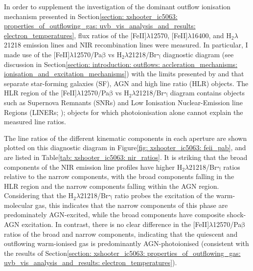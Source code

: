 In order to supplement the investigation of the dominant outflow ionisation mechanism presented in Section\;\ref{section: xshooter_ic5063: properties_of_outflowing_gas: uvb_vis_analysis_and_results: electron_temperatures}, flux ratios of the [FeII]$\lambda$12570, [FeII]$\lambda$16400, and H$_2 \lambda$21218 emission lines and NIR recombination lines \citep{Rodriguez-Ardila2005, Riffel2013a, Colina2015, Riffel2021} were measured. In particular, I made use of the [FeII]$\lambda$12570/Pa$\mathrm{\beta}$ vs H$_2\lambda$21218/Br$\mathrm{\gamma}$ diagnostic diagram (see discussion in Section\;\ref{section: introduction: outflows: accleration_mechanisms: ionisation_and_excitation_mechanisms}) with the limits presented by \citet{Riffel2013a} and \citet{Riffel2021} that separate star-forming galaxies (SF), AGN and high line ratio (HLR) objects. The HLR region of the [FeII]$\lambda$12570/Pa$\mathrm{\beta}$ vs H$_2\lambda$21218/Br$\mathrm{\gamma}$ diagram contains objects such as Supernova Remnants (SNRs) and Low Ionisation Nuclear-Emission line Regions (LINERs; \citealt{Heckman1980}); objects for which photoionisation alone cannot explain the measured line ratios.

The line ratios of the different kinematic components in each aperture are shown plotted on this diagnostic diagram in Figure\;\ref{fig: xshooter_ic5063: feii_pab}, and are listed in Table\;\ref{tab: xshooter_ic5063: nir_ratios}. It is striking that the broad components of the NIR emission line profiles have higher H$_2\lambda$21218/Br$\mathrm{\gamma}$ ratios relative to the narrow components, with the broad components falling in the HLR region and the narrow components falling within the AGN region. Considering that the H$_2\lambda$21218/Br$\mathrm{\gamma}$ ratio probes the excitation of the warm-molecular gas, this indicates that the narrow components of this phase are predominately AGN-excited, while the broad components have composite shock-AGN excitation. In contrast, there is no clear difference in the [FeII]$\lambda$12570/Pa$\mathrm{\beta}$ ratios of the broad and narrow components, indicating that the quiescent and outflowing warm-ionised gas is predominantly AGN-photoionised (consistent with the results of Section\;\ref{section: xshooter_ic5063: properties_of_outflowing_gas: uvb_vis_analysis_and_results: electron_temperatures}).

